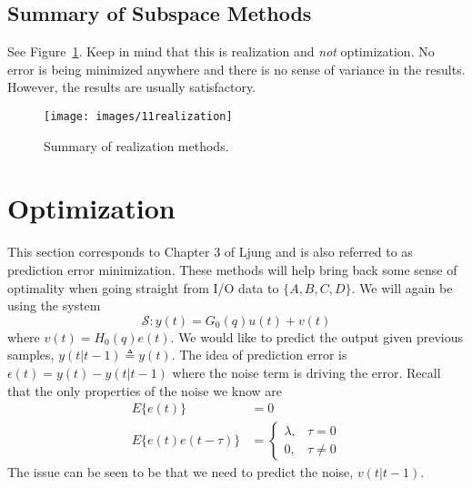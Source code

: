 \subsection{Summary of Subspace Methods}
See Figure~\ref{fig:11realization}.
Keep in mind that this is realization and \textit{not} optimization.
No error is being minimized anywhere and there is no sense of variance in the results.
However, the results are usually satisfactory.

\begin{figure}[ht!]
\centering
\texttt{[image: images/11realization]}
\caption{Summary of realization methods.}
\label{fig:11realization}
\end{figure}

\section{Optimization}
This section corresponds to Chapter 3 of Ljung and is also referred to as prediction error minimization.
These methods will help bring back some sense of optimality when going straight from I/O data to $\{A,B,C,D\}$.
We will again be using the system
$$\mathcal{S}: y(t) = G_0(q)u(t)+v(t)$$
where $v(t) = H_0(q)e(t)$.
We would like to predict the output given previous samples, $y(t|t-1)\triangleq y(t)$.
The idea of prediction error is $\epsilon(t)=y(t)-y(t|t-1)$ where the noise term is driving the error.
Recall that the only properties of the noise we know are
\begin{align*}
E\{e(t)\} &= 0 \\
E\{e(t)e(t-\tau)\} &= \begin{cases} \lambda, & \tau=0 \\ 0, & \tau\neq0 \end{cases}
\end{align*}
The issue can be seen to be that we need to predict the noise, $v(t|t-1)$.

